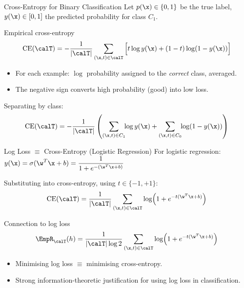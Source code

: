 \begin{frame}{Cross-Entropy for Binary Classification}
  Let $p(\x)\in\{0,1\}$ be the true label, $y(\x)\in[0,1]$ the predicted probability for class $C_1$.

  \begin{block}{Empirical cross-entropy}
    \[
      \mathrm{CE}(\calT)
      = -\frac{1}{|\calT|}\sum_{(\x,t)\in\calT}
        \Big[t\log y(\x) + (1-t)\log(1-y(\x))\Big]
    \]
  \end{block}

  \begin{itemize}
    \item For each example: $\log$ probability assigned to the \emph{correct} class, averaged.
    \item The negative sign converts high probability (good) into low loss.
  \end{itemize}

  \vspace{.3em}
  Separating by class:
  \[
    \mathrm{CE}(\calT)
    = -\frac{1}{|\calT|}
      \left(\sum_{(\x,t)\in C_1}\!\!\log y(\x)
            +\sum_{(\x,t)\in C_0}\!\!\log(1-y(\x))\right)
  \]
\end{frame}

\begin{frame}{Log Loss $\equiv$ Cross-Entropy (Logistic Regression)}
  For logistic regression: $y(\x)=\sigma(\w^T\x+b)=\dfrac{1}{1+e^{-(\w^T\x+b)}}$

  \vspace{.5em}
  Substituting into cross-entropy, using $t\in\{-1,+1\}$:
  \[
    \mathrm{CE}(\calT)
    = \frac{1}{|\calT|}\sum_{(\x,t)\in\calT}\log\!\left(1+e^{-t(\w^T\x+b)}\right)
  \]

  \begin{block}{Connection to log loss}
    \[
      \EmpR_{\calT}(h)
      = \frac{1}{|\calT|\log 2}\sum_{(\x,t)\in\calT}\log\!\left(1+e^{-t(\w^T\x+b)}\right)
    \]
  \end{block}

  \begin{itemize}
    \item Minimising log loss $\equiv$ minimising cross-entropy.
    \item Strong information-theoretic justification for using log loss in classification.
  \end{itemize}
\end{frame}

